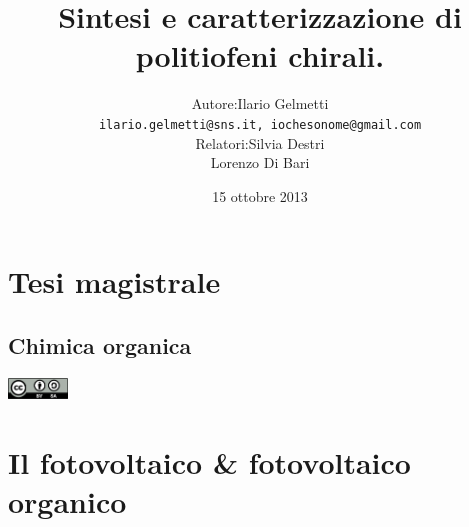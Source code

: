 \documentclass{beamer}
\title{Sintesi e caratterizzazione di politiofeni chirali.}
\date{15 ottobre 2013}
\institute{Dipartimento di Chimica e Chimica Industriale -- Università di Pisa}
\begin{document}
\author[Ilario Gelmetti]{\begin{tabular}{r@{ }l} 
{\small Autore:} & Ilario Gelmetti \\
&\texttt{\tiny ilario.gelmetti@sns.it, iochesonome@gmail.com}  \\[3ex] 
{\small Relatori:} & Silvia Destri\\
& Lorenzo Di Bari
\end{tabular}}

\section{Tesi magistrale}
\subsection{Chimica organica}
\begin{frame}
\titlepage
\begin{center}
\includegraphics[width=0.12\textwidth]{img/cc-by-sa.pdf}
\end{center}
\end{frame}
\section{Il fotovoltaico \& fotovoltaico organico}
\end{document}
